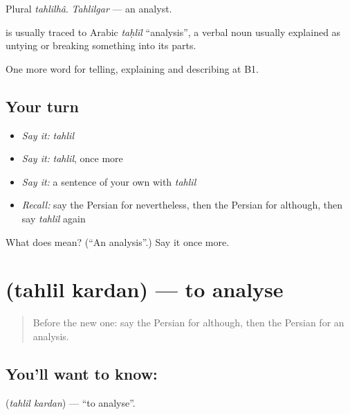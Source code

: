 Plural \emph{tahlilhâ}. \emph{Tahlilgar} — an analyst.

\begin{cousinweb}
\textbf{} is usually traced to Arabic \emph{taḥlīl} \textquotedblleft{}analysis\textquotedblright{}, a verbal noun usually explained as untying or breaking something into its parts.
\end{cousinweb}

\begin{grammarlens}[title={What you've built}]
One more word for telling, explaining and describing at B1.
\end{grammarlens}

\subsection*{Your turn}
\begin{itemize}
\raggedright
  \item \emph{Say it:} \emph{tahlil}
  \item \emph{Say it:} \emph{tahlil}, once more
  \item \emph{Say it:} a sentence of your own with \emph{tahlil}
  \item \emph{Recall:} say the Persian for nevertheless, then the Persian for although, then say \emph{tahlil} again
\end{itemize}

\begin{tcolorbox}[breakable,colback=teal!4,colframe=teal!35!black,title={Before you move on}]
What does  mean? (\textquotedblleft{}An analysis\textquotedblright{}.) Say it once more.
\end{tcolorbox}
\section[\texorpdfstring{\fa{تحلیل} \fa{کردن} (tahlil kardan)}{تحلیل کردن (tahlil kardan)}]{  (tahlil kardan) — to analyse}

\label{lesson:FA-C368-tahlil-kardan}



\begin{quote}
Before the new one: say the Persian for although, then the Persian for an analysis.
\end{quote}

\subsection*{You'll want to know:  }
\textbf{ } (\emph{tahlil kardan}) — \textquotedblleft{}to analyse\textquotedblright{}.

